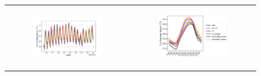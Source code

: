\begin{figure}[hbtp]
\begin{tabular}{cc}
        \begin{subfigure}[t]{0.5\textwidth}
            \caption{}
            \includegraphics[width=\textwidth]{images/chap5/SOP_TS_DC/time_series_cendrosa_t2m.png}
        \end{subfigure} &
        \begin{subfigure}[t]{0.5\textwidth}
            \caption{}
            \includegraphics[width=\textwidth]{images/chap5/SOP_TS_DC/diurnal_cycle_cendrosa_t2m.png}
        \end{subfigure} \\
        

\end{tabular}
\end{figure}
